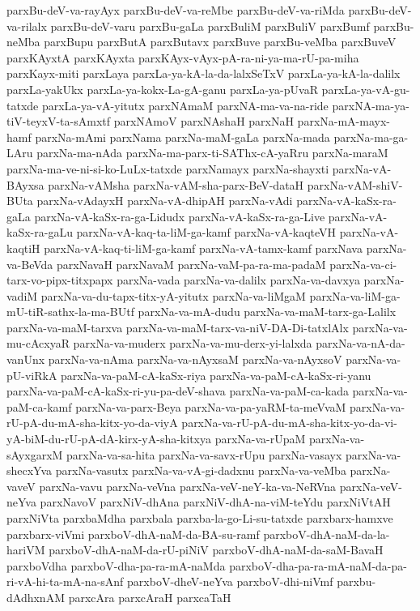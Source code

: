 {parxBu-deV-va-rayAyx
parxBu-deV-va-reMbe
parxBu-deV-va-riMda
parxBu-deV-va-rilalx
parxBu-deV-varu
parxBu-gaLa
parxBuliM
parxBuliV
parxBumf
parxBu-neMba
parxBupu
parxButA
parxButavx
parxBuve
parxBu-veMba
parxBuveV
parxKAyxtA
parxKAyxta
parxKAyx-vAyx-pA-ra-ni-ya-ma-rU-pa-miha
parxKayx-miti
parxLaya
parxLa-ya-kA-la-da-lalxSeTxV
parxLa-ya-kA-la-dalilx
parxLa-yakUkx
parxLa-ya-kokx-La-gA-ganu
parxLa-ya-pUvaR
parxLa-ya-vA-gu-tatxde
parxLa-ya-vA-yitutx
parxNAmaM
parxNA-ma-va-na-ride
parxNA-ma-ya-tiV-teyxV-ta-sAmxtf
parxNAmoV
parxNAshaH
parxNaH
parxNa-mA-mayx-hamf
parxNa-mAmi
parxNama
parxNa-maM-gaLa
parxNa-mada
parxNa-ma-ga-LAru
parxNa-ma-nAda
parxNa-ma-parx-ti-SAThx-cA-yaRru
parxNa-maraM
parxNa-ma-ve-ni-si-ko-LuLx-tatxde
parxNamayx
parxNa-shayxti
parxNa-vA-BAyxsa
parxNa-vAMsha
parxNa-vAM-sha-parx-BeV-dataH
parxNa-vAM-shiV-BUta
parxNa-vAdayxH
parxNa-vA-dhipAH
parxNa-vAdi
parxNa-vA-kaSx-ra-gaLa
parxNa-vA-kaSx-ra-ga-Lidudx
parxNa-vA-kaSx-ra-ga-Live
parxNa-vA-kaSx-ra-gaLu
parxNa-vA-kaq-ta-liM-ga-kamf
parxNa-vA-kaqteVH
parxNa-vA-kaqtiH
parxNa-vA-kaq-ti-liM-ga-kamf
parxNa-vA-tamx-kamf
parxNava
parxNa-va-BeVda
parxNavaH
parxNavaM
parxNa-vaM-pa-ra-ma-padaM
parxNa-va-ci-tarx-vo-pipx-titxpapx
parxNa-vada
parxNa-va-dalilx
parxNa-va-davxya
parxNa-vadiM
parxNa-va-du-tapx-titx-yA-yitutx
parxNa-va-liMgaM
parxNa-va-liM-ga-mU-tiR-sathx-la-ma-BUtf
parxNa-va-mA-dudu
parxNa-va-maM-tarx-ga-Lalilx
parxNa-va-maM-tarxva
parxNa-va-maM-tarx-va-niV-DA-Di-tatxlAlx
parxNa-va-mu-cAcxyaR
parxNa-va-muderx
parxNa-va-mu-derx-yi-lalxda
parxNa-va-nA-da-vanUnx
parxNa-va-nAma
parxNa-va-nAyxsaM
parxNa-va-nAyxsoV
parxNa-va-pU-viRkA
parxNa-va-paM-cA-kaSx-riya
parxNa-va-paM-cA-kaSx-ri-yanu
parxNa-va-paM-cA-kaSx-ri-yu-pa-deV-shava
parxNa-va-paM-ca-kada
parxNa-va-paM-ca-kamf
parxNa-va-parx-Beya
parxNa-va-pa-yaRM-ta-meVvaM
parxNa-va-rU-pA-du-mA-sha-kitx-yo-da-viyA
parxNa-va-rU-pA-du-mA-sha-kitx-yo-da-vi-yA-biM-du-rU-pA-dA-kirx-yA-sha-kitxya
parxNa-va-rUpaM
parxNa-va-sAyxgarxM
parxNa-va-sa-hita
parxNa-va-savx-rUpu
parxNa-vasayx
parxNa-va-shecxYva
parxNa-vasutx
parxNa-va-vA-gi-dadxnu
parxNa-va-veMba
parxNa-vaveV
parxNa-vavu
parxNa-veVna
parxNa-veV-neY-ka-va-NeRVna
parxNa-veV-neYva
parxNavoV
parxNiV-dhAna
parxNiV-dhA-na-viM-teYdu
parxNiVtAH
parxNiVta
parxbaMdha
parxbala
parxba-la-go-Li-su-tatxde
parxbarx-hamxve
parxbarx-viVmi
parxboV-dhA-naM-da-BA-su-ramf
parxboV-dhA-naM-da-la-hariVM
parxboV-dhA-naM-da-rU-piNiV
parxboV-dhA-naM-da-saM-BavaH
parxboVdha
parxboV-dha-pa-ra-mA-naMda
parxboV-dha-pa-ra-mA-naM-da-pa-ri-vA-hi-ta-mA-na-sAnf
parxboV-dheV-neYva
parxboV-dhi-niVmf
parxbu-dAdhxnAM
parxcAra
parxcAraH
parxcaTaH
}
